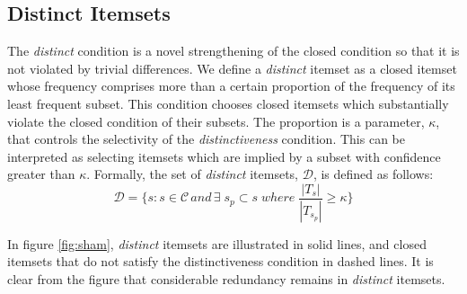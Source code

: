 \documentclass[letterpaper,12pt,titlepage,oneside,final]{book}
\begin{document}
\subsection{Distinct Itemsets}


The \emph{distinct} condition is a novel strengthening of the closed condition
so that it is not violated by trivial differences.
We define a \emph{distinct} itemset as a closed itemset whose frequency
comprises more than a certain proportion of the frequency of its least
frequent subset. 
This condition chooses closed itemsets which substantially violate the closed
condition of their subsets.
The proportion is a parameter, $\kappa$, that controls the selectivity of the
\emph{distinctiveness} condition.
This can be interpreted as selecting itemsets which are implied by a subset
with confidence greater than $\kappa$.
Formally, the set of \emph{distinct} itemsets, $\mathcal{D}$,
is defined as follows:
\begin{equation}\mathcal{D} = \{s: s \in \mathcal{C} \, and \, \exists \; s_{p} \subset s \; where \; \frac{|T_{s}|}{|T_{s_{p}}|} \ge \kappa 
\}\end{equation}

In figure \ref{fig:sham}, \emph{distinct} itemsets are illustrated in solid
lines, and closed itemsets that do not satisfy the distinctiveness condition in dashed lines.
It is clear from the figure that considerable redundancy remains in
\emph{distinct} itemsets.
\end{document}
